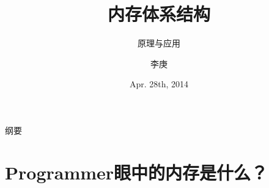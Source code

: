 \documentclass[handout]{beamer}
\begin{document}
\begin{CJK}{UTF8}{gbsn}

\title{内存体系结构}

\subtitle{原理与应用}

\author{李庚}


\date{Apr. 28th, 2014}

\subject{2014技术分享}





\begin{frame}
  \titlepage
\end{frame}

\begin{frame}{纲要}
  \tableofcontents
\end{frame}

\section{Programmer眼中的内存是什么？}


\end{CJK}
\end{document}
